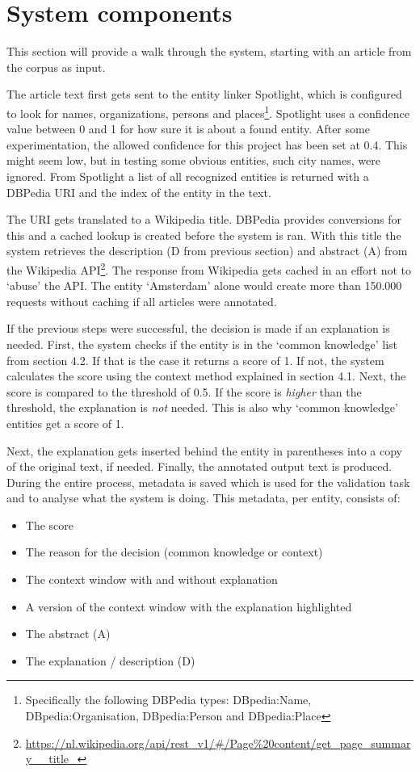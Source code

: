 \documentclass[
10pt, %
a4paper, %
oneside, %
headinclude,footinclude, %
] {book}%
\begin{document}
\section{System components}
This section will provide a walk through the system, starting with an article from the corpus as input.

The article text first gets sent to the entity linker Spotlight, which is configured to look for names, organizations, persons and places\footnote{Specifically the following DBPedia types: DBpedia:Name, DBpedia:Organisation, DBpedia:Person and DBpedia:Place}.
Spotlight uses a confidence value between 0 and 1 for how sure it is about a found entity.
After some experimentation, the allowed confidence for this project has been set at 0.4.
This might seem low, but in testing some obvious entities, such city names, were ignored.
From Spotlight a list of all recognized entities is returned with a DBPedia URI and the index of the entity in the text.

The URI gets translated to a Wikipedia title.
DBPedia provides conversions for this and a cached lookup is created before the system is ran.
With this title the system retrieves the description (D from previous section) and abstract (A) from the Wikipedia API\footnote{\url{https://nl.wikipedia.org/api/rest_v1/\#/Page\%20content/get_page_summary__title_}}.
The response from Wikipedia gets cached in an effort not to `abuse' the API.
The entity `Amsterdam' alone would create more than 150.000 requests without caching if all articles were annotated.

If the previous steps were successful, the decision is made if an explanation is needed.
First, the system checks if the entity is in the `common knowledge' list from section 4.2.
If that is the case it returns a score of 1.
If not, the system calculates the score using the context method explained in section 4.1.
Next, the score is compared to the threshold of 0.5.
If the score is \textit{higher} than the threshold, the explanation is \textit{not} needed.
This is also why `common knowledge' entities get a score of 1.

Next, the explanation gets inserted behind the entity in parentheses into a copy of the original text, if needed.
Finally, the annotated output text is produced.
During the entire process, metadata is saved which is used for the validation task and to analyse what the system is doing.
This metadata, per entity, consists of:

\begin{itemize}
  \item The score
  \item The reason for the decision (common knowledge or context)
  \item The context window with and without explanation
  \item A version of the context window with the explanation highlighted
  \item The abstract (A)
  \item The explanation / description (D)
\end{itemize}
\end{document}

